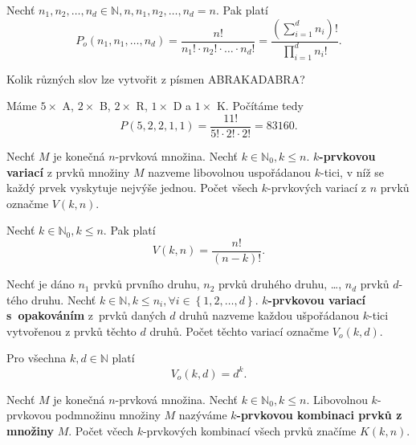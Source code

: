 \begin{veta}
    Nechť $n_1, n_2, \dots, n_d \in \mathbb N, n, n_1, n_2, \dots, n_d=n.$ Pak platí
    $$P_o(n_1, n_1, \dots, n_d)=\frac{n!}{n_1!\cdot n_2!\cdot\hdots \cdot n_d!}=
    \frac{\left ( \sum_{i=1}^d n_i \right )! }{\prod_{i=1}^d n_i!}.$$
\end{veta}

\begin{priklad}
Kolik různých slov lze vytvořit z písmen ABRAKADABRA?
\end{priklad}

\begin{reseni}
Máme $5\times$ A, $2\times $ B, $2\times$ R, $1\times$ D a $1\times $ K.
Počítáme tedy $$P(5,2,2,1,1)=\frac{11!}{5!\cdot 2!\cdot 2!}=83160.$$
\end{reseni}

\begin{definition}
    Nechť $M$ je konečná $n$-prvková množina. Nechť $k \in \mathbb N_0, k\leq n.$
    \textbf{$k$-prvkovou variací} z prvků množiny $M$ nazveme libovolnou
    uspořádanou $k$-tici, v níž se každý prvek vyskytuje nejvýše jednou. Počet
    všech $k$-prvkových variací z $n$ prvků označme $V(k,n).$
\end{definition}

\begin{veta}
    Nechť $k \in \mathbb N_0, k\leq n.$ Pak platí
    $$V(k,n)=\frac{n!}{(n-k)!}.$$
\end{veta}

\begin{definition}
    Nechť je dáno $n_1$ prvků prvního druhu, $n_2$ prvků druhého druhu, \dots,
    $n_d$ prvků $d$-tého druhu. Nechť $k\in \mathbb N, k \leq n_i, \forall
    i \in \left \{ 1, 2, \dots, d \right \} .$ \textbf{$k$-prvkovou variací s~opakováním}
    z~prvků daných $d$ druhů nazveme každou ušpořádanou $k$-tici
    vytvořenou z prvků těchto $d$ druhů. Počet těchto variací označme $V_o(k,d).$
\end{definition}

\begin{veta}
    Pro všechna $k, d \in \mathbb N$ platí
    $$V_o(k,d)=d^k.$$
\end{veta}

\begin{definition}
    Nechť $M$ je konečná $n$-prvková množina. Nechť $k \in \mathbb N_0, k\leq n.$
    Libovolnou $k$-prvkovou podmnožinu množiny $M$ nazýváme \textbf{$k$-prvkovou
    kombinaci prvků z množiny} $M$. Počet včech $k$-prvkových kombinací všech
    prvků značíme $K(k,n).$
\end{definition}

